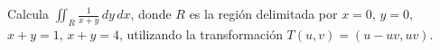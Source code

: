 Calcula $\displaystyle \iint_R \frac{1}{x + y} \, dy \, dx$, donde \( R \) es la región delimitada por \( x = 0 \), \( y = 0 \), \( x + y = 1 \), \( x + y = 4 \), utilizando la transformación \( T(u, v) = (u - uv, uv) \).
